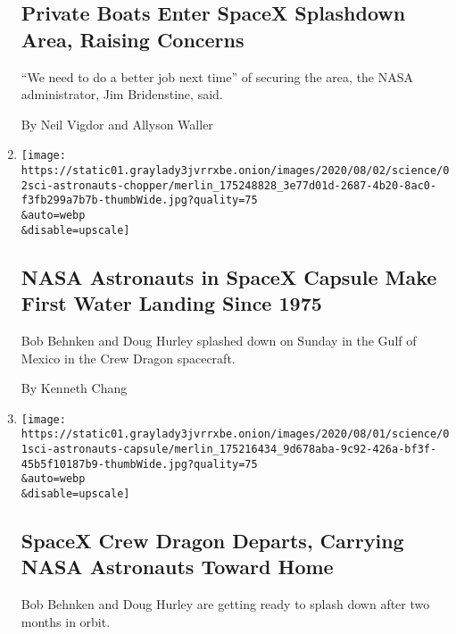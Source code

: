 \begin{enumerate}
  \hypertarget{private-boats-enter-spacex-splashdown-area-raising-concerns}{%
  \subsection{Private Boats Enter SpaceX Splashdown Area, Raising
  Concerns}\label{private-boats-enter-spacex-splashdown-area-raising-concerns}}

  ``We need to do a better job next time'' of securing the area, the
  NASA administrator, Jim Bridenstine, said.

  By Neil Vigdor and Allyson Waller
\item
  \href{/2020/08/02/science/spacex-nasa-return.html}{}

  \texttt{[image: https://static01.graylady3jvrrxbe.onion/images/2020/08/02/science/02sci-astronauts-chopper/merlin\_175248828\_3e77d01d-2687-4b20-8ac0-f3fb299a7b7b-thumbWide.jpg?quality=75\\\&auto=webp\\\&disable=upscale]}

  \hypertarget{nasa-astronauts-in-spacex-capsule-make-first-water-landing-since-1975}{%
  \subsection{NASA Astronauts in SpaceX Capsule Make First Water Landing
  Since
  1975}\label{nasa-astronauts-in-spacex-capsule-make-first-water-landing-since-1975}}

  Bob Behnken and Doug Hurley splashed down on Sunday in the Gulf of
  Mexico in the Crew Dragon spacecraft.

  By Kenneth Chang
\item
  \href{/2020/08/01/science/nasa-spacex-astronauts.html}{}

  \texttt{[image: https://static01.graylady3jvrrxbe.onion/images/2020/08/01/science/01sci-astronauts-capsule/merlin\_175216434\_9d678aba-9c92-426a-bf3f-45b5f10187b9-thumbWide.jpg?quality=75\\\&auto=webp\\\&disable=upscale]}

  \hypertarget{spacex-crew-dragon-departs-carrying-nasa-astronauts-toward-home}{%
  \subsection{SpaceX Crew Dragon Departs, Carrying NASA Astronauts
  Toward
  Home}\label{spacex-crew-dragon-departs-carrying-nasa-astronauts-toward-home}}

  Bob Behnken and Doug Hurley are getting ready to splash down after two
  months in orbit.


\end{enumerate}

